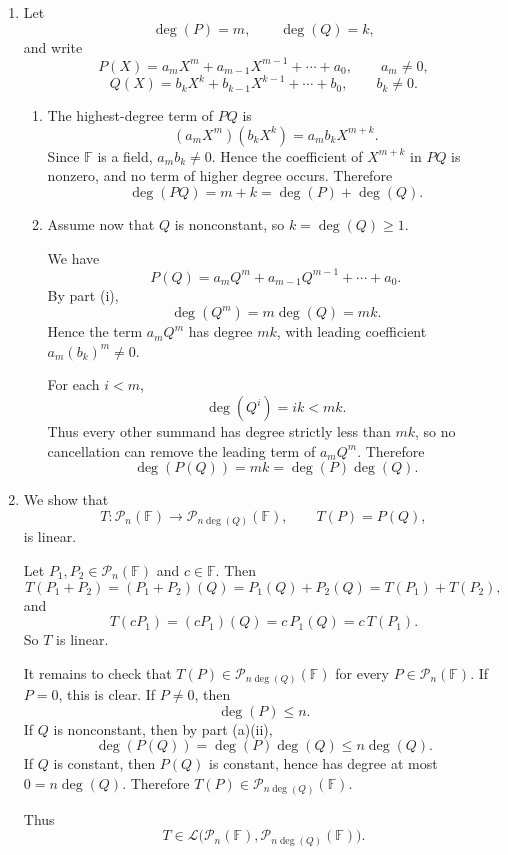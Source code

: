 \documentclass[12pt]{article}
\newcommand{\F}{\mathbb{F}}
\newcommand{\cL}{\mathcal{L}}
\newcommand{\cP}{\mathcal{P}}
\begin{document}
\begin{enumerate}[label=(\alph*)]
\item Let
\[
\deg(P)=m,\qquad \deg(Q)=k,
\]
and write
\[
P(X)=a_mX^m+a_{m-1}X^{m-1}+\cdots+a_0,\qquad a_m\neq 0,
\]
\[
Q(X)=b_kX^k+b_{k-1}X^{k-1}+\cdots+b_0,\qquad b_k\neq 0.
\]

\begin{enumerate}[label=(\roman*)]
\item The highest-degree term of \(PQ\) is
\[
(a_mX^m)(b_kX^k)=a_mb_kX^{m+k}.
\]
Since \(\F\) is a field, \(a_mb_k\neq 0\). Hence the coefficient of \(X^{m+k}\) in \(PQ\) is nonzero, and no term of higher degree occurs. Therefore
\[
\boxed{\deg(PQ)=m+k=\deg(P)+\deg(Q).}
\]

\item Assume now that \(Q\) is nonconstant, so \(k=\deg(Q)\ge 1\).

We have
\[
P(Q)=a_mQ^m+a_{m-1}Q^{m-1}+\cdots+a_0.
\]
By part (i),
\[
\deg(Q^m)=m\deg(Q)=mk.
\]
Hence the term \(a_mQ^m\) has degree \(mk\), with leading coefficient \(a_m(b_k)^m\neq 0\).

For each \(i<m\),
\[
\deg(Q^i)=ik<mk.
\]
Thus every other summand has degree strictly less than \(mk\), so no cancellation can remove the leading term of \(a_mQ^m\). Therefore
\[
\boxed{\deg(P(Q))=mk=\deg(P)\deg(Q).}
\]
\end{enumerate}

\item We show that
\[
T:\cP_n(\F)\to \cP_{n\deg(Q)}(\F),\qquad T(P)=P(Q),
\]
is linear.

Let \(P_1,P_2\in \cP_n(\F)\) and \(c\in\F\). Then
\[
T(P_1+P_2)=(P_1+P_2)(Q)=P_1(Q)+P_2(Q)=T(P_1)+T(P_2),
\]
and
\[
T(cP_1)=(cP_1)(Q)=c\,P_1(Q)=c\,T(P_1).
\]
So \(T\) is linear.

It remains to check that \(T(P)\in \cP_{n\deg(Q)}(\F)\) for every \(P\in \cP_n(\F)\). If \(P=0\), this is clear. If \(P\neq 0\), then
\[
\deg(P)\le n.
\]
If \(Q\) is nonconstant, then by part (a)(ii),
\[
\deg(P(Q))=\deg(P)\deg(Q)\le n\deg(Q).
\]
If \(Q\) is constant, then \(P(Q)\) is constant, hence has degree at most \(0=n\deg(Q)\). Therefore \(T(P)\in \cP_{n\deg(Q)}(\F)\).

Thus
\[
\boxed{T\in \cL\bigl(\cP_n(\F),\cP_{n\deg(Q)}(\F)\bigr).}
\]
\end{enumerate}

\newpage
\end{document}
